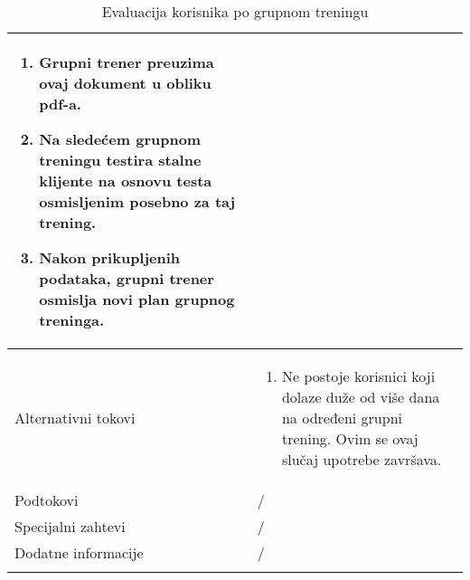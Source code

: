 \documentclass[../grupniTreninzi.tex]{subfiles}
\begin{document}
\begin{longtable}{| p{} | p{} |}
\begin{enumerate}
        \item Grupni trener preuzima ovaj dokument u obliku pdf-a.
        \item Na sledećem grupnom treningu testira stalne klijente na osnovu testa osmisljenim posebno za taj trening.
        \item Nakon prikupljenih podataka, grupni trener osmislja novi plan grupnog treninga.
    \end{enumerate}\\
\hline
    Alternativni tokovi & 
    \begin{enumerate}
        \item Ne postoje korisnici koji dolaze duže od više dana na određeni grupni trening. Ovim se ovaj slučaj upotrebe završava.
    \end{enumerate}\\
\hline
    Podtokovi & /\\
\hline
    Specijalni zahtevi & /\\
\hline
    Dodatne informacije & /\\
\hline
\caption{Evaluacija korisnika po grupnom treningu} %
\end{longtable}
\end{document}
